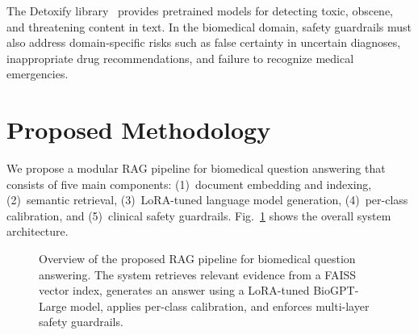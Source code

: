 \documentclass[conference]{IEEEtran}
\begin{document}
The Detoxify library~\cite{detoxify2020} provides pretrained models for detecting toxic, obscene, and threatening content in text. In the biomedical domain, safety guardrails must also address domain-specific risks such as false certainty in uncertain diagnoses, inappropriate drug recommendations, and failure to recognize medical emergencies.


\section{Proposed Methodology}

We propose a modular RAG pipeline for biomedical question answering that consists of five main components: (1)~document embedding and indexing, (2)~semantic retrieval, (3)~LoRA-tuned language model generation, (4)~per-class calibration, and (5)~clinical safety guardrails. Fig.~\ref{fig:architecture} shows the overall system architecture.

\begin{figure}[h]
\centering
{}
\caption{Overview of the proposed RAG pipeline for biomedical question answering. The system retrieves relevant evidence from a FAISS vector index, generates an answer using a LoRA-tuned BioGPT-Large model, applies per-class calibration, and enforces multi-layer safety guardrails.}
\label{fig:architecture}
\end{figure}
\end{document}
